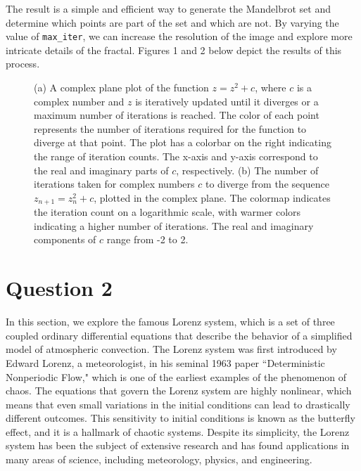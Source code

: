 \documentclass[letterpaper,10.9pt]{article}
\begin{document}
The result is a  simple and efficient way to generate the Mandelbrot set and determine which points are part of the set and which are not. By varying the value of \texttt{max\_iter}, we can increase the resolution of the image and explore more intricate details of the fractal. Figures 1 and 2 below depict the results of this process. 

\begin{figure}[H]
  \centering
  \hfill
  \caption{(a) A complex plane plot of the function $z = z^2 + c$, where $c$ is a complex number and $z$ is iteratively updated until it diverges or a maximum number of iterations is reached. The color of each point represents the number of iterations required for the function to diverge at that point. The plot has a colorbar on the right indicating the range of iteration counts. The x-axis and y-axis correspond to the real and imaginary parts of $c$, respectively. (b) The number of iterations taken for complex numbers $c$ to diverge from the sequence $z_{n+1} = z_n^2+c$, plotted in the complex plane. The colormap indicates the iteration count on a logarithmic scale, with warmer colors indicating a higher number of iterations. The real and imaginary components of $c$ range from -2 to 2.}
  \label{fig:both_plots}
\end{figure}




\section{Question 2}

In this section, we explore the famous Lorenz system, which is a set of three coupled ordinary differential equations that describe the behavior of a simplified model of atmospheric convection. The Lorenz system was first introduced by Edward Lorenz, a meteorologist, in his seminal 1963 paper ``Deterministic Nonperiodic Flow," which is one of the earliest examples of the phenomenon of chaos. The equations that govern the Lorenz system are highly nonlinear, which means that even small variations in the initial conditions can lead to drastically different outcomes. This sensitivity to initial conditions is known as the butterfly effect, and it is a hallmark of chaotic systems. Despite its simplicity, the Lorenz system has been the subject of extensive research and has found applications in many areas of science, including meteorology, physics, and engineering.\\
\end{document}
